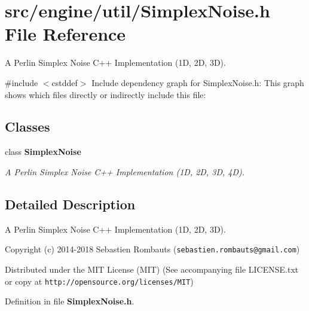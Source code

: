\section{src/engine/util/\+Simplex\+Noise.h File Reference}
\label{_simplex_noise_8h}


A Perlin Simplex Noise C++ Implementation (1D, 2D, 3D).  


{\ttfamily \#include $<$cstddef$>$}\newline
Include dependency graph for Simplex\+Noise.\+h\+:
This graph shows which files directly or indirectly include this file\+:
\subsection*{Classes}
\begin{DoxyCompactItemize}
\item 
class \textbf{ Simplex\+Noise}
\begin{DoxyCompactList}\small\item\em A Perlin Simplex Noise C++ Implementation (1D, 2D, 3D, 4D). \end{DoxyCompactList}\end{DoxyCompactItemize}


\subsection{Detailed Description}
A Perlin Simplex Noise C++ Implementation (1D, 2D, 3D). 

Copyright (c) 2014-\/2018 Sebastien Rombauts ({\tt sebastien.\+rombauts@gmail.\+com})

Distributed under the M\+IT License (M\+IT) (See accompanying file L\+I\+C\+E\+N\+S\+E.\+txt or copy at {\tt http\+://opensource.\+org/licenses/\+M\+IT}) 

Definition in file \textbf{ Simplex\+Noise.\+h}.

